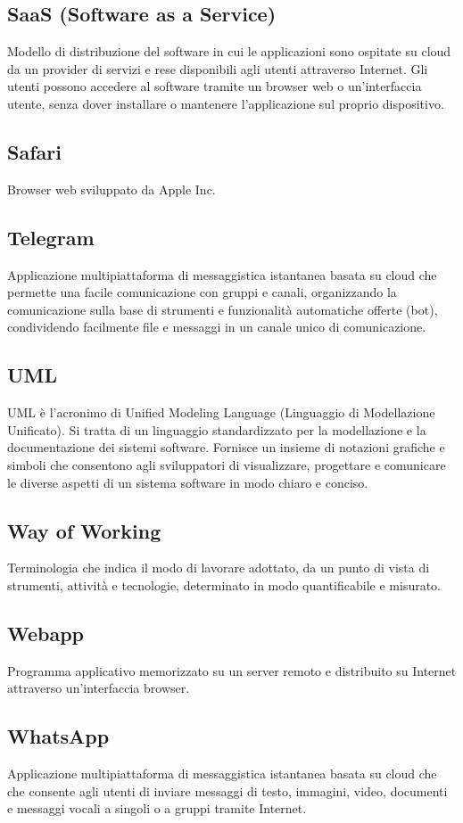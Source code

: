 \subsection{SaaS (Software as a Service)}Modello di distribuzione del software in cui le applicazioni sono ospitate su cloud da un provider di servizi e rese disponibili agli utenti attraverso Internet. Gli utenti possono accedere al software tramite un browser web o un'interfaccia utente, senza dover installare o mantenere l'applicazione sul proprio dispositivo.
\subsection{Safari}Browser web sviluppato da Apple Inc.
\subsection{Telegram}Applicazione multipiattaforma di messaggistica istantanea basata su cloud che permette una facile comunicazione con gruppi e canali, organizzando la comunicazione sulla base di strumenti e funzionalità automatiche offerte (bot), condividendo facilmente file e messaggi in un canale unico di comunicazione.
\subsection{UML}UML è l'acronimo di Unified Modeling Language (Linguaggio di Modellazione Unificato). Si tratta di un linguaggio standardizzato per la modellazione e la documentazione dei sistemi software. Fornisce un insieme di notazioni grafiche e simboli che consentono agli sviluppatori di visualizzare, progettare e comunicare le diverse aspetti di un sistema software in modo chiaro e conciso.
\subsection{Way of Working}Terminologia che indica il modo di lavorare adottato, da un punto di vista di strumenti, attività e tecnologie, determinato in modo quantificabile e misurato.
\subsection{Webapp}Programma applicativo memorizzato su un server remoto e distribuito su Internet attraverso un'interfaccia browser.
\subsection{WhatsApp}Applicazione multipiattaforma di messaggistica istantanea basata su cloud che che consente agli utenti di inviare messaggi di testo, immagini, video, documenti e messaggi vocali a singoli o a gruppi tramite Internet.
